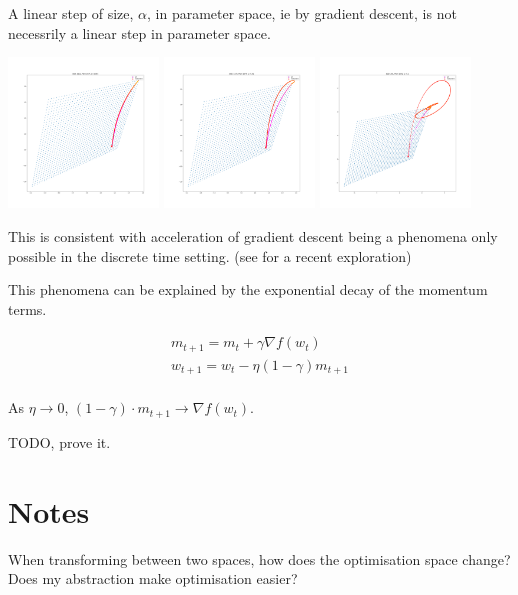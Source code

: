 A linear step of size, \(\alpha\), in parameter space, ie by gradient
descent, is not necessrily a linear step in parameter space.

\includegraphics[width=0.3\textwidth,height=0.25\textheight]{../../pictures/figures/vi_sgd-vs-vi_mom_0001.png}
\includegraphics[width=0.3\textwidth,height=0.25\textheight]{../../pictures/figures/vi_sgd-vs-vi_mom_001.png}
\includegraphics[width=0.3\textwidth,height=0.25\textheight]{../../pictures/figures/vi_sgd-vs-vi_mom_01.png}

This is consistent with acceleration of gradient descent being a phenomena only possible in the discrete time setting. (see \cite{Betancourt2018} for a recent exploration)

This phenomena can be explained by the exponential decay of the momentum terms.

\begin{align}
m_{t+1} = m_t + \gamma\nabla f(w_t) \\
w_{t+1} = w_t - \eta (1-\gamma) m_{t+1} \\
\end{align}

As \(\eta \to 0\), \((1-\gamma) \cdot m_{t+1} \to \nabla f(w_t)\).

TODO, prove it.

\section{Notes}

When transforming between two spaces, how does the optimisation space
change? Does my abstraction make optimisation easier?
